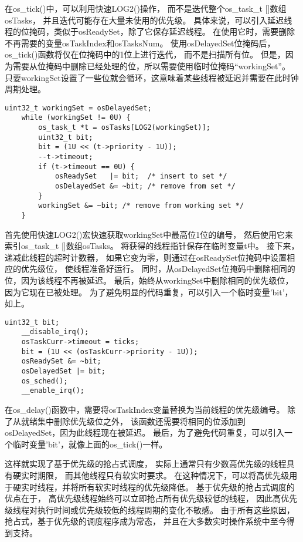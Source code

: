 在os\_tick()中，可以利用快速LOG2()操作，
而不是迭代整个os\_task\_t []数组osTasks，
并且迭代可能存在大量未使用的优先级。
具体来说，可以引入延迟线程的位掩码，类似于osReadySet，除了它保存延迟线程。
在使用它时，需要删除不再需要的变量osTaskIndex和osTasksNum。
使用osDelayedSet位掩码后，os\_tick()函数将仅在位掩码中的1位上进行迭代，
而不是扫描所有位。
但是，因为需要从位掩码中删除已经处理的位，所以需要使用临时位掩码“workingSet”。
只要workingSet设置了一些位就会循环，这意味着某些线程被延迟并需要在此时钟周期处理。
\begin{lstlisting}[language={[ANSI]C},keywordstyle=\color{blue!70},commentstyle=\color{red!50!green!50!blue!50},frame=shadowbox, rulesepcolor=\color{red!20!green!20!blue!20}]
    uint32_t workingSet = osDelayedSet;
    while (workingSet != 0U) {
        os_task_t *t = osTasks[LOG2(workingSet)];
        uint32_t bit;
        bit = (1U << (t->priority - 1U));
        --t->timeout;
        if (t->timeout == 0U) {
            osReadySet   |= bit;  /* insert to set */
            osDelayedSet &= ~bit; /* remove from set */
        }
        workingSet &= ~bit; /* remove from working set */
    }
\end{lstlisting}
首先使用快速LOG2()宏快速获取workingSet中最高位1位的编号，
然后使用它来索引os\_task\_t []数组osTasks。
将获得的线程指针保存在临时变量t中。
接下来，递减此线程的超时计数器，
如果它变为零，则通过在osReadySet位掩码中设置相应的优先级位，
使线程准备好运行。
同时，从osDelayedSet位掩码中删除相同的位，因为该线程不再被延迟。
最后，始终从workingSet中删除相同的优先级位，因为它现在已被处理。
为了避免明显的代码重复，可以引入一个临时变量'bit'，如上。
\begin{lstlisting}[language={[ANSI]C},keywordstyle=\color{blue!70},commentstyle=\color{red!50!green!50!blue!50},frame=shadowbox, rulesepcolor=\color{red!20!green!20!blue!20}]
    uint32_t bit;
    __disable_irq();
    osTaskCurr->timeout = ticks;
    bit = (1U << (osTaskCurr->priority - 1U));
    osReadySet &= ~bit;
    osDelayedSet |= bit;
    os_sched();
    __enable_irq();
\end{lstlisting}
在os\_delay()函数中，需要将osTaskIndex变量替换为当前线程的优先级编号。
除了从就绪集中删除优先级位之外，
该函数还需要将相同的位添加到osDelayedSet，因为此线程现在被延迟。
最后，为了避免代码重复，可以引入一个临时变量'bit'，就像上面的os\_tick()一样。


这样就实现了基于优先级的抢占式调度，
实际上通常只有少数高优先级的线程具有硬实时期限，
而其他线程只有软实时要求。
在这种情况下，可以将高优先级用于硬实时线程，并将所有软实时线程的优先级降低。
基于优先级的抢占式调度的优点在于，
高优先级线程始终可以立即抢占所有优先级较低的线程，
因此高优先级线程对执行时间或优先级较低的线程周期的变化不敏感。
由于所有这些原因，抢占式，基于优先级的调度程序成为常态，
并且在大多数实时操作系统中至今得到支持。

